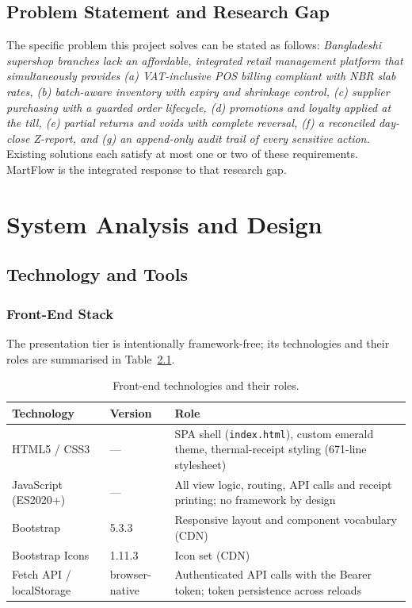 \documentclass[12pt,a4paper]{report}
\begin{document}
\section{Problem Statement and Research Gap}
The specific problem this project solves can be stated as follows:
\emph{Bangladeshi supershop branches lack an affordable, integrated retail management
platform that simultaneously provides (a) VAT-inclusive POS billing compliant with NBR
slab rates, (b) batch-aware inventory with expiry and shrinkage control, (c) supplier
purchasing with a guarded order lifecycle, (d) promotions and loyalty applied at the till,
(e) partial returns and voids with complete reversal, (f) a reconciled day-close Z-report,
and (g) an append-only audit trail of every sensitive action.} Existing solutions each
satisfy at most one or two of these requirements. MartFlow is the integrated response to
that research gap.

\chapter{System Analysis and Design}

\section{Technology and Tools}

\subsection{Front-End Stack}
The presentation tier is intentionally framework-free; its technologies and their roles
are summarised in Table~\ref{tab:frontend}.

\begin{table}[H]
\centering
\caption{Front-end technologies and their roles.}
\label{tab:frontend}
\small
\begin{tabularx}{\textwidth}{l l X}
\toprule
\textbf{Technology} & \textbf{Version} & \textbf{Role} \\
\midrule
HTML5 / CSS3 & --- & SPA shell (\texttt{index.html}), custom emerald theme,
thermal-receipt styling (671-line stylesheet) \\
JavaScript (ES2020+) & --- & All view logic, routing, API calls and receipt printing;
no framework by design \\
Bootstrap & 5.3.3 & Responsive layout and component vocabulary (CDN) \\
Bootstrap Icons & 1.11.3 & Icon set (CDN) \\
Fetch API / localStorage & browser-native & Authenticated API calls with the Bearer
token; token persistence across reloads \\
\bottomrule
\end{tabularx}
\end{table}
\end{document}
